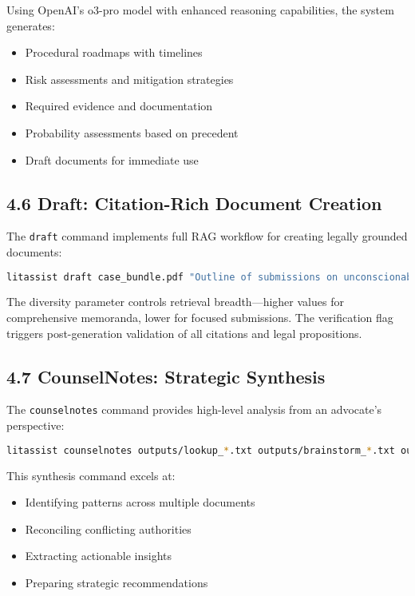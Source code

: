\documentclass[12pt,a4paper]{article}
\begin{document}
Using OpenAI's o3-pro model with enhanced reasoning capabilities, the system generates:
\begin{itemize}
\item Procedural roadmaps with timelines
\item Risk assessments and mitigation strategies
\item Required evidence and documentation
\item Probability assessments based on precedent
\item Draft documents for immediate use
\end{itemize}

\subsection*{4.6 Draft: Citation-Rich Document Creation}

The \texttt{draft} command implements full RAG workflow for creating legally grounded documents:

\begin{lstlisting}[language=bash]
litassist draft case_bundle.pdf "Outline of submissions on unconscionable conduct claim" --diversity 0.8 --verify
\end{lstlisting}

The diversity parameter controls retrieval breadth—higher values for comprehensive memoranda, lower for focused submissions. The verification flag triggers post-generation validation of all citations and legal propositions.

\subsection*{4.7 CounselNotes: Strategic Synthesis}

The \texttt{counselnotes} command provides high-level analysis from an advocate's perspective:

\begin{lstlisting}[language=bash]
litassist counselnotes outputs/lookup_*.txt outputs/brainstorm_*.txt outputs/digest_*.txt --extract all --verify
\end{lstlisting}

This synthesis command excels at:
\begin{itemize}
\item Identifying patterns across multiple documents
\item Reconciling conflicting authorities
\item Extracting actionable insights
\item Preparing strategic recommendations
\end{itemize}
\end{document}
